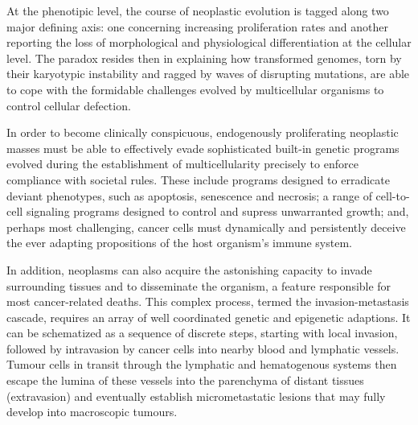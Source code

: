 At the phenotipic level, the course of neoplastic evolution is tagged along two
major defining axis: one concerning increasing proliferation rates and another
reporting the loss of morphological and physiological differentiation at the
cellular level.\cite{tarabichi_systems_2013}  The paradox resides then in
explaining how transformed genomes, torn by their karyotypic instability and
ragged by waves of disrupting mutations, are able to cope with the formidable
challenges evolved by multicellular organisms to control cellular defection.

In order to become clinically conspicuous, endogenously proliferating neoplastic
masses must be able to effectively evade sophisticated \mbox{built-in} genetic
programs evolved during the establishment of multicellularity precisely to
enforce compliance with societal rules.  These include programs designed to
erradicate deviant phenotypes, such as apoptosis, senescence and necrosis; a
range of \mbox{cell-to-cell} signaling programs designed to control and supress
unwarranted growth; and, perhaps most challenging, cancer cells must dynamically
and persistently deceive the ever adapting propositions of the host organism's
immune system.


In addition, neoplasms can also acquire the astonishing capacity to invade
surrounding tissues and to disseminate the organism, a feature responsible for
most cancer-related deaths.  This complex process, termed the
\mbox{invasion-metastasis} cascade,\cite{valastyan_tumor_2011} requires an array
of well coordinated genetic and epigenetic adaptions.  It can be schematized as
a sequence of discrete steps, starting with local invasion, followed by
intravasion by cancer cells into nearby blood and lymphatic vessels.  Tumour
cells in transit through the lymphatic and hematogenous systems then escape
the lumina of these vessels into the parenchyma of distant tissues (extravasion)
and eventually establish micrometastatic lesions that may fully develop into
macroscopic tumours.

